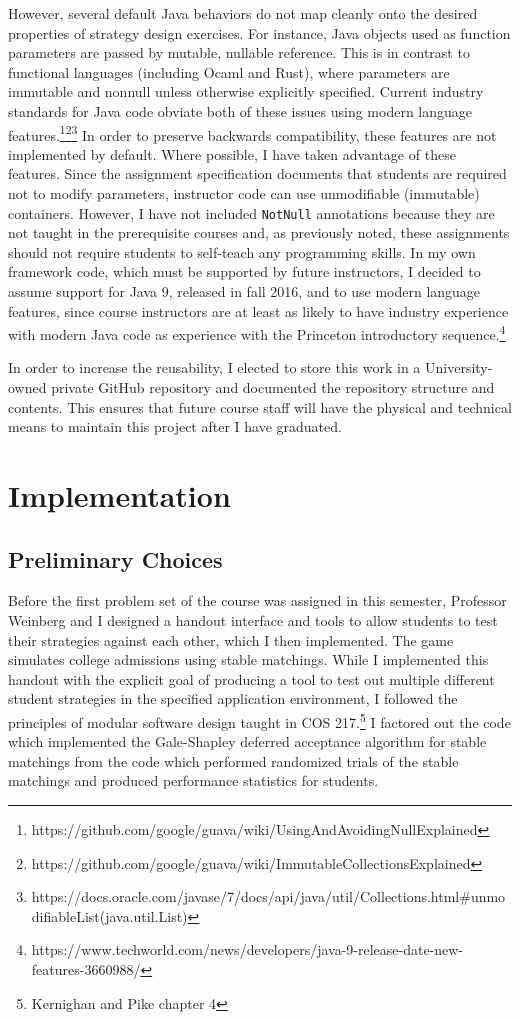 \documentclass[pageno]{jpaper}
\begin{document}
However, several default Java behaviors do not map cleanly onto the desired properties of strategy design exercises.
For instance, Java objects used as function parameters are passed by mutable, nullable reference.
This is in contrast to functional languages (including Ocaml and Rust), where parameters are immutable and nonnull unless otherwise explicitly specified.
Current industry standards for Java code obviate both of these issues using modern language features.\footnote{https://github.com/google/guava/wiki/UsingAndAvoidingNullExplained}\footnote{https://github.com/google/guava/wiki/ImmutableCollectionsExplained}\footnote{https://docs.oracle.com/javase/7/docs/api/java/util/Collections.html\#unmodifiableList(java.util.List)}
In order to preserve backwards compatibility, these features are not implemented by default.
Where possible, I have taken advantage of these features.
Since the assignment specification documents that students are required not to modify parameters, instructor code can use unmodifiable (immutable) containers.
However, I have not included \texttt{NotNull} annotations because they are not taught in the prerequisite courses and, as previously noted, these assignments should not require students to self-teach any programming skills.
In my own framework code, which must be supported by future instructors, I decided to assume support for Java 9, released in fall 2016, and to use modern language features, since course instructors are at least as likely to have industry experience with modern Java code as experience with the Princeton introductory sequence.\footnote{https://www.techworld.com/news/developers/java-9-release-date-new-features-3660988/}

In order to increase the reusability, I elected to store this work in a University-owned private GitHub repository and documented the repository structure and contents.
This ensures that future course staff will have the physical and technical means to maintain this project after I have graduated.

\section*{Implementation}
\subsection*{Preliminary Choices}
Before the first problem set of the course was assigned in this semester, Professor Weinberg and I designed a handout interface and tools to allow students to test their strategies against each other, which I then implemented.
The game simulates college admissions using stable matchings.
While I implemented this handout with the explicit goal of producing a tool to test out multiple different student strategies in the specified application environment, I followed the principles of modular software design taught in COS 217.\footnote{Kernighan and Pike chapter 4}
I factored out the code which implemented the Gale-Shapley deferred acceptance algorithm for stable matchings from the code which performed randomized trials of the stable matchings and produced performance statistics for students.
\end{document}
